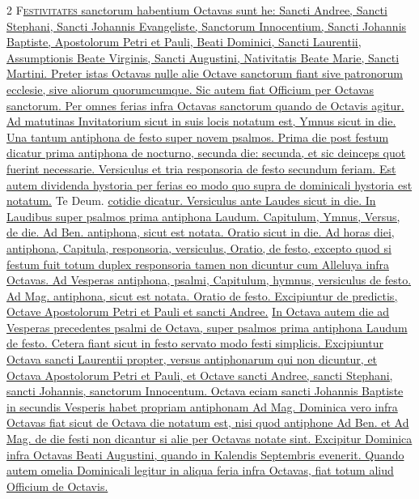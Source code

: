 \begin{multicols*}{2}
{\color{Red} }
\lettrine[lines=2]{\zallmancaps \color{Blue} F}{}\ul{\textsc{estivitates} sanctorum habentium Octavas sunt he: Sancti Andree, Sancti Stephani, Sancti Johannis Evangeliste, Sanctorum Innocentium, Sancti Johannis Baptiste, Apostolorum Petri et Pauli, Beati Dominici, Sancti Laurentii, Assumptionis Beate Virginis, Sancti Augustini, Nativitatis Beate Marie, Sancti Martini.
Preter istas Octavas nulle alie Octave sanctorum fiant sive patronorum ecclesie, sive aliorum quorumcumque. Sic autem fiat Officium per Octavas sanctorum.
Per omnes ferias infra Octavas sanctorum quando de Octavis agitur. Ad matutinas Invitatorium sicut in suis locis notatum est, Ymnus sicut in die. Una tantum antiphona de festo super novem psalmos. Prima die post festum dicatur prima antiphona de nocturno, secunda die: secunda, et sic deinceps quot fuerint necessarie. Versiculus et tria responsoria de festo secundum feriam. Est autem dividenda hystoria per ferias eo modo quo supra de dominicali hystoria est notatum.} Te Deum. \ul{cotidie dicatur. Versiculus ante Laudes sicut in die.
In Laudibus super psalmos prima antiphona Laudum. Capitulum, Ymnus, Versus, de die. Ad Ben. antiphona, sicut est notata. Oratio sicut in die. Ad horas diei, antiphona, Capitula, responsoria, versiculus, Oratio, de festo, excepto quod si festum fuit totum duplex responsoria tamen non dicuntur cum Alleluya infra Octavas. Ad Vesperas antiphona, psalmi, Capitulum, hymnus, versiculus de festo. Ad Mag. antiphona, sicut est notata. Oratio de festo. Excipiuntur de predictis, Octave Apostolorum Petri et Pauli et sancti Andree.}
\newline \ul{In Octava autem die ad Vesperas precedentes psalmi de Octava, super psalmos prima antiphona Laudum de festo. Cetera fiant sicut in festo servato modo festi simplicis. Excipiuntur Octava sancti Laurentii propter, versus antiphonarum qui non dicuntur, et Octava Apostolorum Petri et Pauli, et Octave sancti Andree, sancti Stephani, sancti Johannis, sanctorum Innocentum.
Octava eciam sancti Johannis Baptiste in secundis Vesperis habet propriam antiphonam Ad Mag. Dominica vero infra Octavas fiat sicut de Octava die notatum est, nisi quod antiphone Ad Ben. et Ad Mag. de die festi non dicantur si alie per Octavas notate sint. Excipitur Dominica infra Octavas Beati Augustini, quando in Kalendis Septembris evenerit.
Quando autem omelia Dominicali legitur in aliqua feria infra Octavas, fiat totum aliud Officium de Octavis.}


\end{multicols*}
